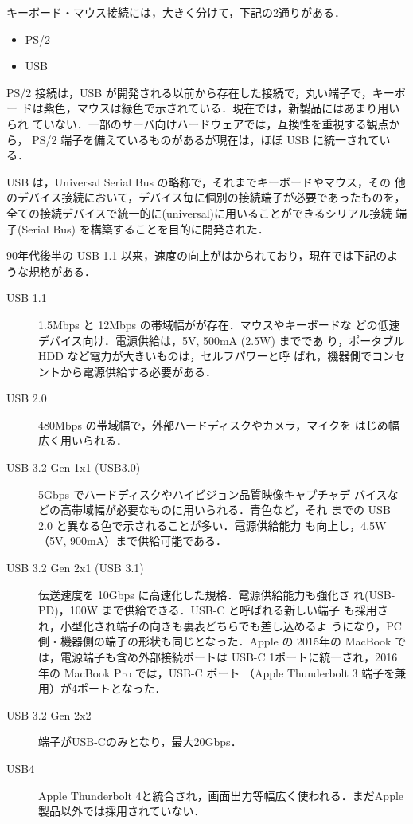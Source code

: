 キーボード・マウス接続には，大きく分けて，下記の2通りがある．
\begin{itemize}
 \item PS/2
 \item USB
\end{itemize}

PS/2 接続は，USB が開発される以前から存在した接続で，丸い端子で，キーボー
ドは紫色，マウスは緑色で示されている．現在では，新製品にはあまり用いられ
ていない．一部のサーバ向けハードウェアでは，互換性を重視する観点から，
PS/2 端子を備えているものがあるが現在は，ほぼ USB に統一されている．

USB は，Universal Serial Bus の略称で，それまでキーボードやマウス，その
他のデバイス接続において，デバイス毎に個別の接続端子が必要であったものを，
全ての接続デバイスで統一的に(universal)に用いることができるシリアル接続
端子(Serial Bus) を構築することを目的に開発された．

90年代後半の USB 1.1 以来，速度の向上がはかられており，現在では下記のよ
うな規格がある．

\begin{description}
 \item[USB 1.1] 1.5Mbps と 12Mbps の帯域幅がが存在．マウスやキーボードな
	    どの低速デバイス向け．電源供給は，5V, 500mA (2.5W) までであ
	    り，ポータブル HDD など電力が大きいものは，セルフパワーと呼
	    ばれ，機器側でコンセントから電源供給する必要がある．
 \item[USB 2.0] 480Mbps の帯域幅で，外部ハードディスクやカメラ，マイクを
	    はじめ幅広く用いられる．
 \item[USB 3.2 Gen 1x1 (USB3.0)] 5Gbps でハードディスクやハイビジョン品質映像キャプチャデ
	    バイスなどの高帯域幅が必要なものに用いられる．青色など，それ
	    までの USB 2.0 と異なる色で示されることが多い．電源供給能力
	    も向上し，4.5W（5V, 900mA）まで供給可能である．
 \item[USB 3.2 Gen 2x1 (USB 3.1)] 伝送速度を 10Gbps に高速化した規格．電源供給能力も強化さ
	    れ(USB-PD)，100W まで供給できる．USB-C と呼ばれる新しい端子
	    も採用され，小型化され端子の向きも裏表どちらでも差し込めるよ
	    うになり，PC側・機器側の端子の形状も同じとなった．Apple の
	    2015年の MacBook では，電源端子も含め外部接続ポートは USB-C
	    1ポートに統一され，2016年の MacBook Pro では，USB-C ポート
	    （Apple Thunderbolt 3 端子を兼用）が4ポートとなった．
 \item[USB 3.2 Gen 2x2] 端子がUSB-Cのみとなり，最大20Gbps．
 \item[USB4] Apple Thunderbolt 4と統合され，画面出力等幅広く使われる．まだApple製品以外では採用されていない．
\end{description}

